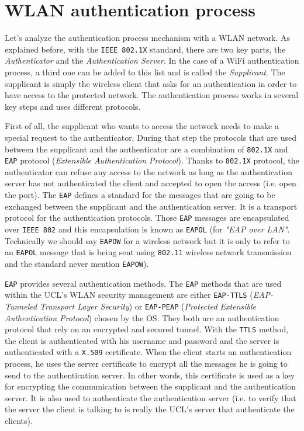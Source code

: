\section{WLAN authentication process}
Let's analyze the authentication process mechanism with a WLAN network.
As explained before, with the \texttt{IEEE 802.1X} standard, there are two key parts, the \textit{Authenticator} and the \textit{Authentication Server}. In the case of a WiFi authentication process, a third one can be added to this list and is called the \textit{Supplicant}. The supplicant is simply the wireless client that asks for an authentication in order to have access to the protected network. The authentication process works in several key steps and uses different protocols.

First of all, the supplicant who wants to access the network needs to make a special request to the authenticator. During that step the protocols that are used between the supplicant and the authenticator are a combination of \texttt{802.1X} and \texttt{EAP} protocol (\textit{Extensible Authentication Protocol}). Thanks to \texttt{802.1X} protocol, the authenticator can refuse any access to the network as long as the authentication server has not authenticated the client and accepted to open the access (i.e. open the port). The \texttt{EAP} defines a standard for the messages that are going to be exchanged between the supplicant and the authentication server. It is a  transport protocol for the authentication protocols. Those \texttt{EAP} messages are encapsulated over \texttt{IEEE 802} and this encapsulation is known as \texttt{EAPOL} (for \textit{"EAP over LAN"}. Technically we should say \texttt{EAPOW} for a wireless network but it is only to refer to an \texttt{EAPOL} message that is being sent using \texttt{802.11} wireless network transmission and the standard never mention \texttt{EAPOW}).

\texttt{EAP} provides several authentication methods. The \texttt{EAP} methods that are used within the UCL's WLAN  security management are either \texttt{EAP-TTLS} (\textit{EAP-Tunneled Transport Layer Security}) or \texttt{EAP-PEAP} (\textit{Protected Extensible Authentication Protocol}) chosen by the OS. They both are an authentication protocol that rely on an encrypted and secured tunnel. With the \texttt{TTLS} method, the client is authenticated with his username and password and the server is authenticated with a \texttt{X.509} certificate. When the client starts an authentication process, he uses the server certificate to encrypt all the messages he is going to send to the authentication server. In other words, this certificate is used as a key for encrypting the communication between the supplicant and the authentication server. It is also used to authenticate the authentication server (i.e. to verify that the server the client is talking to is really the UCL's server that authenticate the clients).


